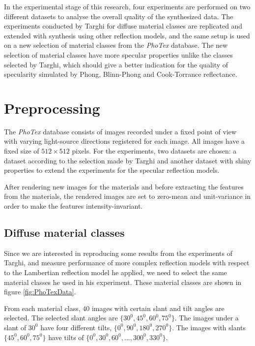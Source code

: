 \hypertarget{experiments}{
}

In the experimental stage of this research, four experiments are performed on two different datasets to analyse the overall quality of the synthesized data. The experiments conducted by Targhi for diffuse material classes are replicated and extended with synthesis using other reflection models, and the same setup is used on a new selection of material classes from the {\it PhoTex} database. The new selection of material classes have more specular properties unlike the classes selected by Targhi, which should give a better indication for the quality of specularity simulated by Phong, Blinn-Phong and Cook-Torrance reflectance.

\section{Preprocessing}\label{sec:preprocessing}
The {\it PhoTex} database consists of images recorded under a fixed point of view with varying light-source directions registered for each image. All images have a fixed size of $512 \times 512$ pixels. For the experiments, two datasets are chosen: a dataset according to the selection made by Targhi and another dataset with shiny properties to extend the experiments for the specular reflection models.

After rendering new images for the materials and before extracting the features from the materials, the rendered images are set to zero-mean and unit-variance in order to make the features intensity-invariant.

\subsection{Diffuse material classes}
Since we are interested in reproducing some results from the experiments of Targhi, and measure performance of more complex reflection models with respect to the Lambertian reflection model he applied, we need to select the same material classes he used in his experiment. These material classes are shown in figure \ref{fig:PhoTexData}.

From each material class, 40 images with certain slant and tilt angles are selected. The selected slant angles are $\{30^0, 45^0,60^0,75^0\}$. The images under a slant of $30^0$ have four different tilts, $\{0^0, 90^0, 180^0, 270^0\}$. The images with slants $\{45^0,60^0,75^0\}$ have tilts of $\{0^0,30^0,60^0,..., 300^0,330^0\}$. 

